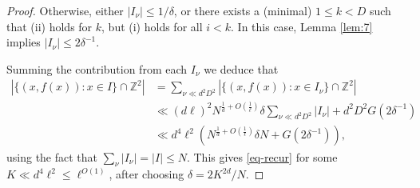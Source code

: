 \documentclass[10pt,a4paper]{amsart}
\newcommand{\Z}{{\mathbb Z}}
\begin{document}
\begin{proof}
Otherwise, either $\lvert I_\nu\rvert \leq 1/\delta$, or there exists a (minimal) $1\le k<D$ such that (ii) holds for $k$, but (i) holds for all $i<k$. In this case, Lemma \ref{lem:7} implies $|I_\nu| \le 2\delta^{-1}$.

Summing the contribution from each $I_\nu$ we deduce that 
\begin{align*}
\left\lvert \big\{(x,f(x)) : x \in I \big\}\cap \Z^2 \right\rvert & =  \sum_{\nu\ll d^2D^2}\left\lvert \big\{(x,f(x)) : x \in I_\nu \big\}\cap \Z^2 \right\rvert\\
& \ll (d\ell)^2 N^{\frac{1}{d}+O(\frac{1}{\ell})}\delta \sum_{\nu\ll d^2D^2}|I_\nu|+ d^2D^2G(2\delta^{-1}) \\
&\ll d^4\ell^2 \left( N^{\frac{1}{d}+O(\frac{1}{\ell})}\delta N +G(2\delta^{-1})\right),
\end{align*}
using the fact that $\sum_\nu \lvert I_\nu\rvert=\lvert I\rvert\leq N$. This gives \eqref{eq-recur} for some $K\ll d^4\ell^2\leq\ell^{O(1)}$, after choosing $\delta = 2K^{2d}/N$.
\end{proof}
\end{document}
